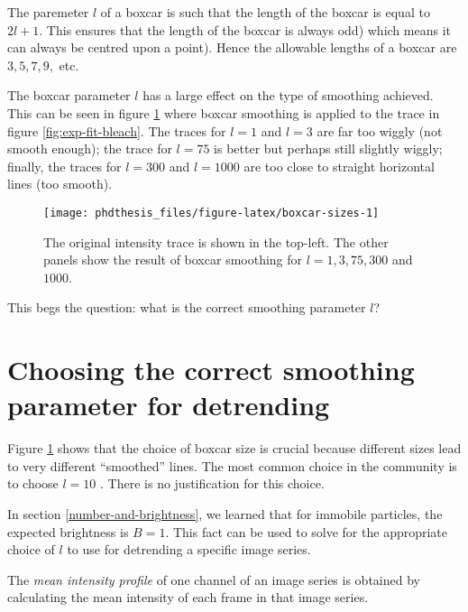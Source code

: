\documentclass[12pt,]{book}
\theoremstyle{definition}
\theoremstyle{definition}
\theoremstyle{definition}
\theoremstyle{remark}
\let\BeginKnitrBlock\begin \let\EndKnitrBlock\end
\begin{document}
The paremeter \(l\) of a boxcar is such that the length of the boxcar is
equal to \(2l + 1\). This ensures that the length of the boxcar is
always odd) which means it can always be centred upon a point). Hence
the allowable lengths of a boxcar are \(3,5,7,9,\) etc.

The boxcar parameter \(l\) has a large effect on the type of smoothing
achieved. This can be seen in figure \ref{fig:boxcar-sizes} where boxcar
smoothing is applied to the trace in figure \ref{fig:exp-fit-bleach}.
The traces for \(l=1\) and \(l=3\) are far too wiggly (not smooth
enough); the trace for \(l=75\) is better but perhaps still slightly
wiggly; finally, the traces for \(l=300\) and \(l=1000\) are too close
to straight horizontal lines (too smooth).





\begin{figure}

\texttt{[image: phdthesis\_files/figure-latex/boxcar-sizes-1]} \hfill{}

\caption{The original intensity trace is shown in the
top-left. The other panels show the result of boxcar smoothing for
\(l = 1, 3, 75, 300\) and \(1000\).}\label{fig:boxcar-sizes}
\end{figure}

This begs the question: what is the correct smoothing parameter \(l\)?

\section{Choosing the correct smoothing parameter for
detrending}\label{choosing-the-correct-smoothing-parameter-for-detrending}

Figure \ref{fig:boxcar-sizes} shows that the choice of boxcar size is
crucial because different sizes lead to very different ``smoothed''
lines. The most common choice in the community is to choose \(l = 10\)
\citep{SimFCS}. There is no justification for this choice.

In section \ref{number-and-brightness}, we learned that for immobile
particles, the expected brightness is \(B = 1\). This fact can be used
to solve for the appropriate choice of \(l\) to use for detrending a
specific image series.

\BeginKnitrBlock{definition}
\protect\hypertarget{def:unnamed-chunk-23}{}{\label{def:unnamed-chunk-23}
}The \emph{mean intensity profile} of one channel of an image series is
obtained by calculating the mean intensity of each frame in that image
series.
\EndKnitrBlock{definition}
\end{document}
